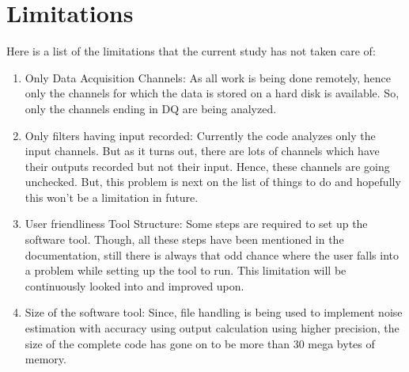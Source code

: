\documentclass[colorlinks=true,pdfstartview=FitV,linkcolor=blue,
            citecolor=red,urlcolor=magenta]{ligodoc}
\begin{document}
\section{Limitations}
	Here is a list of the limitations that the current study has not taken care of:
	\begin{enumerate}
		\item Only Data Acquisition Channels: As all work is being done remotely, hence only the channels for which the data is stored on a hard disk is available. So, only the channels ending in \textunderscore DQ are being analyzed.
		\item Only filters having input recorded: Currently the code analyzes only the input channels. But as it turns out, there are lots of channels which have their outputs recorded but not their input. Hence, these channels are going unchecked. But, this problem is next on the list of things to do and hopefully this won't be a limitation in future.
		\item User friendliness Tool Structure: Some steps are required to set up the software tool. Though, all these steps have been mentioned in the documentation, still there is always that odd chance where the user falls into a problem while setting up the tool to run. This limitation will be continuously looked into and improved upon.
		\item Size of the software tool: Since, file handling is being used to implement noise estimation with accuracy using output calculation using higher precision, the size of the complete code has gone on to be more than 30 mega bytes of memory. 
		\end{enumerate}
\end{document}
